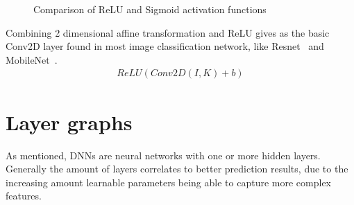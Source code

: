 \documentclass[12pt,a4paper,english
]{tunithesis}
\begin{document}
\begin{figure}[ht]
  \centering
  \begin{minipage}[t]{.45\textwidth}
    \centering
  \end{minipage}
  \begin{minipage}[t]{.45\textwidth}
    \centering
  \end{minipage}
  \caption{Comparison of ReLU and Sigmoid activation functions}
  \label{fig:activation-functions}
\end{figure}


Combining 2 dimensional affine transformation and ReLU gives as the basic Conv2D layer found in most image classification network, like Resnet~\parencite{he2015deepresiduallearningimage} and MobileNet~\parencite{howard2017mobilenetsefficientconvolutionalneural}.
\begin{align}
  ReLU(Conv2D(I, K) + b)
  \label{eq:conv2d}
\end{align}

\section{Layer graphs}
As mentioned, DNNs are neural networks with one or more hidden layers. Generally the amount of layers correlates to better prediction results, due to the increasing amount learnable parameters being able to capture more complex features.
\end{document}
